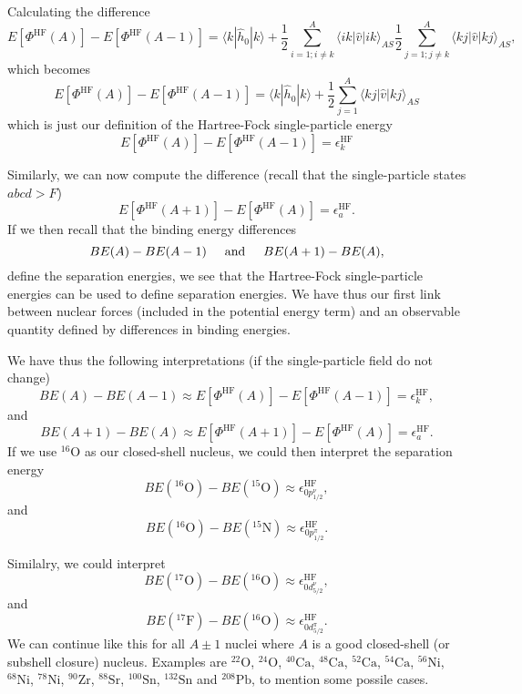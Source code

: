 \documentclass[graybox,sectrefs,envcountresetchap,open=right]{svmonodo}
\begin{document}
Calculating the difference 
\[
  E[\Phi^{\mathrm{HF}}(A)]-   E[\Phi^{\mathrm{HF}}(A-1)] 
  = \langle k | \hat{h}_0 | k \rangle +
  \frac{1}{2}\sum_{i=1;i\ne k}^A\langle ik|\hat{v}|ik\rangle_{AS}  \frac{1}{2}\sum_{j=1;j\ne k}^A\langle kj|\hat{v}|kj\rangle_{AS},
\]
which becomes 
\[
  E[\Phi^{\mathrm{HF}}(A)]-   E[\Phi^{\mathrm{HF}}(A-1)] 
  = \langle k | \hat{h}_0 | k \rangle +
  \frac{1}{2}\sum_{j=1}^A\langle kj|\hat{v}|kj\rangle_{AS}
\]
which is just our definition of the Hartree-Fock single-particle energy
\[
  E[\Phi^{\mathrm{HF}}(A)]-   E[\Phi^{\mathrm{HF}}(A-1)] 
  = \epsilon_k^{\mathrm{HF}} 
\]


Similarly, we can now compute the difference (recall that the single-particle states $abcd > F$)
\[
  E[\Phi^{\mathrm{HF}}(A+1)]-   E[\Phi^{\mathrm{HF}}(A)]= \epsilon_a^{\mathrm{HF}}. 
\]
If we then recall that the binding energy differences 
\[
BE(A)-BE(A-1) \hspace{0.5cm} \mathrm{and} \hspace{0.5cm} BE(A+1)-BE(A), 
\]
define the separation energies, we see that the Hartree-Fock single-particle energies can be used to
define separation energies. We have thus our first link between nuclear forces (included in the potential energy term) and an observable quantity defined by differences in binding energies. 


We have thus the following interpretations (if the single-particle field do not change)
\[
BE(A)-BE(A-1)\approx  E[\Phi^{\mathrm{HF}}(A)]-   E[\Phi^{\mathrm{HF}}(A-1)] 
  = \epsilon_k^{\mathrm{HF}}, 
\]
and
\[
BE(A+1)-BE(A)\approx  E[\Phi^{\mathrm{HF}}(A+1)]-   E[\Phi^{\mathrm{HF}}(A)] =  \epsilon_a^{\mathrm{HF}}. 
\]
If  we use ${}^{16}\mbox{O}$ as our closed-shell nucleus, we could then interpret the separation energy
\[
BE(^{16}\mathrm{O})-BE(^{15}\mathrm{O})\approx \epsilon_{0p^{\nu}_{1/2}}^{\mathrm{HF}}, 
\]
and
\[
BE(^{16}\mathrm{O})-BE(^{15}\mathrm{N})\approx \epsilon_{0p^{\pi}_{1/2}}^{\mathrm{HF}}.
\]


Similalry, we could interpret
\[
BE(^{17}\mathrm{O})-BE(^{16}\mathrm{O})\approx \epsilon_{0d^{\nu}_{5/2}}^{\mathrm{HF}}, 
\]
and 
\[
BE(^{17}\mathrm{F})-BE(^{16}\mathrm{O})\approx\epsilon_{0d^{\pi}_{5/2}}^{\mathrm{HF}}.
\]
We can continue like this for all $A\pm 1$ nuclei where $A$ is a good closed-shell (or subshell closure)
nucleus. Examples are ${}^{22}\mbox{O}$, ${}^{24}\mbox{O}$, ${}^{40}\mbox{Ca}$, ${}^{48}\mbox{Ca}$, ${}^{52}\mbox{Ca}$, ${}^{54}\mbox{Ca}$, ${}^{56}\mbox{Ni}$, 
${}^{68}\mbox{Ni}$, ${}^{78}\mbox{Ni}$, ${}^{90}\mbox{Zr}$, ${}^{88}\mbox{Sr}$, ${}^{100}\mbox{Sn}$, ${}^{132}\mbox{Sn}$ and ${}^{208}\mbox{Pb}$, to mention some possile cases.
\end{document}
